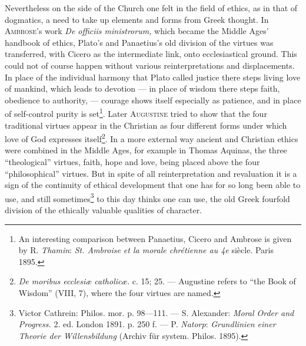 \documentclass[12pt,a4paper,openany]{book}
\newcommand{\opage}[1]{\marginnote{\footnotesize\textit{[#1]}}}
\begin{document}
Nevertheless on the side of the Church one felt in the field of ethics, as in that of dogmatics, a need to take
up elements and forms from Greek thought. In \textsc{Ambrose}'s work \textit{De officiis ministrorum,} which became
the Middle Ages' handbook of ethics, Plato's and Panaetius's old division of the virtues was transferred, with
Cicero as the intermediate link, onto ecclesiastical ground. This could not of course happen without various
reinterpretations and displacements. In place of the individual harmony that Plato called justice there steps
living love of mankind, which leads to devotion --- in place of wisdom there steps faith, obedience to authority,
--- courage shows itself especially as patience, and in place of self-control purity is
set\footnote[2]{An interesting comparison between Panaetius, Cicero and Ambrose is given by R. \emph{Thamin}:
\textit{St. Ambroise et la morale chrétienne au 4e} siècle. Paris 1895.}. Later \textsc{Augustine} tried to show
that the four traditional
\opage{204}virtues appear in the Christian as four different forms under which love of God expresses
itself\footnote[1]{\textit{De moribus ecclesiæ catholicæ.} c. 15; 25. --- Augustine refers to ``the Book of
Wisdom'' (VIII, 7), where the four virtues are named.}. In a more external way ancient and Christian ethics were
combined in the Middle Ages, for example in Thomas Aquinas, the three ``theological'' virtues, faith, hope and
love, being placed above the four ``philosophical'' virtues. But in spite of all reinterpretation and
revaluation it is a sign of the continuity of ethical development that one has for so long been able to use, and
still sometimes\footnote[2]{Victor Cathrein: Philos. mor. p. 98---111. --- S. Alexander: \textit{Moral Order and
Progress.} 2. ed. London 1891. p. 250 f. --- P. \emph{Natorp}: \textit{Grundlinien einer Theorie der
Willensbildung} (Archiv für system. Philos. 1895).} to this day thinks one can use, the old Greek fourfold
division of the ethically valuable qualities of character.
\end{document}
